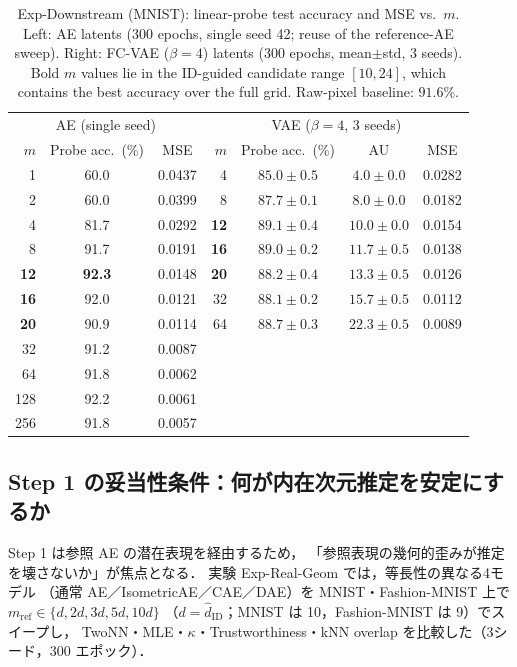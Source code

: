 \documentclass[11pt,a4paper]{jsarticle}
\newcommand{\hatdID}{\hat{d}_{\mathrm{ID}}}
\newcommand{\kap}{\kappa}
\begin{document}
\begin{table}[H]
\centering
\caption{Exp-Downstream (MNIST): linear-probe test accuracy and MSE vs.\ $m$.
Left: AE latents (300 epochs, single seed 42; reuse of the reference-AE
sweep). Right: FC-VAE ($\beta = 4$) latents (300 epochs, mean$\pm$std, 3
seeds). Bold $m$ values lie in the ID-guided candidate range $[10, 24]$,
which contains the best accuracy over the full grid.
Raw-pixel baseline: $91.6\%$.}
\label{tab:downstream}
\small
\begin{tabular}{r cc | r ccc}
\toprule
\multicolumn{3}{c|}{AE (single seed)} & \multicolumn{4}{c}{VAE ($\beta = 4$, 3 seeds)} \\
$m$ & Probe acc.\ (\%) & MSE & $m$ & Probe acc.\ (\%) & AU & MSE \\
\midrule
1 & 60.0 & 0.0437 & 4 & $85.0 \pm 0.5$ & $4.0 \pm 0.0$ & 0.0282 \\
2 & 60.0 & 0.0399 & 8 & $87.7 \pm 0.1$ & $8.0 \pm 0.0$ & 0.0182 \\
4 & 81.7 & 0.0292 & \textbf{12} & $\boldsymbol{89.1 \pm 0.4}$ & $10.0 \pm 0.0$ & 0.0154 \\
8 & 91.7 & 0.0191 & \textbf{16} & $89.0 \pm 0.2$ & $11.7 \pm 0.5$ & 0.0138 \\
\textbf{12} & \textbf{92.3} & 0.0148 & \textbf{20} & $88.2 \pm 0.4$ & $13.3 \pm 0.5$ & 0.0126 \\
\textbf{16} & 92.0 & 0.0121 & 32 & $88.1 \pm 0.2$ & $15.7 \pm 0.5$ & 0.0112 \\
\textbf{20} & 90.9 & 0.0114 & 64 & $88.7 \pm 0.3$ & $22.3 \pm 0.5$ & 0.0089 \\
32 & 91.2 & 0.0087 &  & & & \\
64 & 91.8 & 0.0062 &  & & & \\
128 & 92.2 & 0.0061 &  & & & \\
256 & 91.8 & 0.0057 &  & & & \\
\bottomrule
\end{tabular}
\end{table}

\subsection{Step 1 の妥当性条件：何が内在次元推定を安定にするか}\label{sec:exp_real_geom}

Step 1 は参照 AE の潜在表現を経由するため，
「参照表現の幾何的歪みが推定を壊さないか」が焦点となる．
実験 Exp-Real-Geom では，等長性の異なる4モデル
（通常 AE／IsometricAE\cite{kato2020rdae}／CAE\cite{rifai2011cae}／DAE\cite{alain2014dae}）を
MNIST・Fashion-MNIST 上で$m_{\mathrm{ref}} \in \{d, 2d, 3d, 5d, 10d\}$
（$d = \hatdID$；MNIST は 10，Fashion-MNIST は 9）でスイープし，
TwoNN・MLE・$\kap$・Trustworthiness・kNN overlap を比較した（3シード，300 エポック）．
\end{document}
